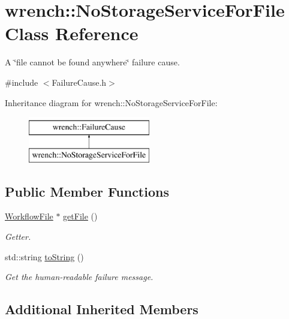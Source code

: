 \hypertarget{classwrench_1_1_no_storage_service_for_file}{}\section{wrench\+:\+:No\+Storage\+Service\+For\+File Class Reference}
\label{classwrench_1_1_no_storage_service_for_file}


A \char`\"{}file cannot be found anywhere\char`\"{} failure cause.  




{\ttfamily \#include $<$Failure\+Cause.\+h$>$}

Inheritance diagram for wrench\+:\+:No\+Storage\+Service\+For\+File\+:\begin{figure}[H]
\begin{center}
\leavevmode
\includegraphics[height=2.000000cm]{classwrench_1_1_no_storage_service_for_file}
\end{center}
\end{figure}
\subsection*{Public Member Functions}
\begin{DoxyCompactItemize}
\item 
\hyperlink{classwrench_1_1_workflow_file}{Workflow\+File} $\ast$ \hyperlink{classwrench_1_1_no_storage_service_for_file_a0f9c9e16bac0150881b4303385b716a0}{get\+File} ()
\begin{DoxyCompactList}\small\item\em Getter. \end{DoxyCompactList}\item 
std\+::string \hyperlink{classwrench_1_1_no_storage_service_for_file_ab3941ca284f35abd00e9292e22d7d553}{to\+String} ()
\begin{DoxyCompactList}\small\item\em Get the human-\/readable failure message. \end{DoxyCompactList}\end{DoxyCompactItemize}
\subsection*{Additional Inherited Members}


